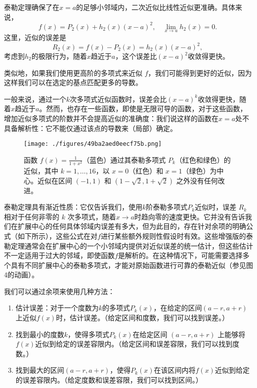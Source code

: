 泰勒定理确保了在\( x = a \)的足够小邻域内，二次近似比线性近似更准确。具体来说，
\[
f(x) = P_2(x) + h_2(x)(x - a)^2, \quad \lim_{x \to a} h_2(x) = 0.~
\]
这里，近似的误差是
\[
R_2(x) = f(x) - P_2(x) = h_2(x)(x - a)^2,~
\]
考虑到\( h_2 \)的极限行为，随着\( x \)趋近于\( a \)，这个误差比\( (x - a)^2 \)收敛得更快。

类似地，如果我们使用更高阶的多项式来近似 \( f \)，我们可能得到更好的近似，因为这样我们可以在选定的基点匹配更多的导数。

一般来说，通过一个\( k \)次多项式近似函数时，误差会比\( (x - a)^k \)收敛得更快，随着\( x \)趋近于\( a \)。然而，也存在一些函数，即使是无限可导的函数，对于这些函数，增加近似多项式的阶数并不会提高近似的准确度：我们说这样的函数在\( x = a \)处不具备解析性：它不能仅通过该点的导数来（局部）确定。
\begin{figure}[ht]
\centering
\texttt{[image: ./figures/49ba2aed0eecf75b.png]}
\caption{函数 \( f(x) = \frac{1}{1 + x^2} \)（蓝色）通过其泰勒多项式 \( P_k \)（红色和绿色）的近似，其中 \( k = 1, \ldots, 16 \)，以 \( x = 0 \)（红色）和 \( x = 1 \)（绿色）为中心。近似在区间 \( (-1, 1) \) 和 \( (1 - \sqrt{2}, 1 + \sqrt{2}) \) 之外没有任何改进。} \label{fig_TLGS_4}
\end{figure}
泰勒定理具有渐近性质：它仅告诉我们，使用\( k \)阶泰勒多项式\( P_k \)近似时，误差 \( R_k \)相对于任何非零的 \( k \) 次多项式，随着\( x \to a \)时趋向零的速度更快。它并没有告诉我们在扩展中心的任何具体邻域内误差有多大，但为此目的，存在针对余项的明确公式（如下所示），这些公式在对\( f \)进行某些额外规则性假设时有效。这些增强版的泰勒定理通常会在扩展中心的一个小邻域内提供对近似误差的统一估计，但这些估计不一定适用于过大的邻域，即使函数\( f \)是解析的。在这种情况下，可能需要选择多个具有不同扩展中心的泰勒多项式，才能对原始函数进行可靠的泰勒近似（参见图4的动画）。

我们可以通过余项来使用几种方法：
\begin{enumerate}
\item 估计误差：对于一个度数为\( k \)的多项式\( P_k(x) \)，在给定的区间\( (a - r, a + r) \)上近似\( f(x) \)时，估计误差。（给定区间和度数，我们可以找到误差。）
\item 找到最小的度数\( k \)，使得多项式\( P_k(x) \)在给定区间 \( (a - r, a + r) \) 上能够将\( f(x) \)近似到给定的误差容限内。（给定区间和误差容限，我们可以找到度数。）
\item 找到最大的区间\( (a - r, a + r) \)，使得\( P_k(x) \)在该区间内将\( f(x) \)近似到给定的误差容限内。（给定度数和误差容限，我们可以找到区间。）
\end{enumerate}
